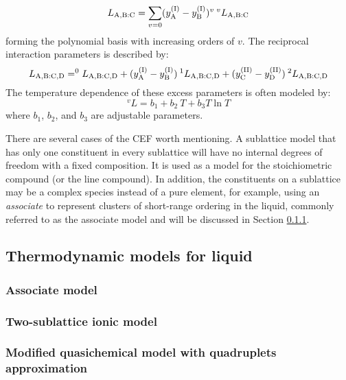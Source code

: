 \begin{equation} \label{method:eq:CEFLabc}
    L_{{\rm A,B}: {\rm C}} = \sum_{v=0}(y_{\rm A}^{({\rm I})}-y_{\rm B}^{({\rm I})})^v\:^vL_{{\rm A, B:C}}
\end{equation}
forming the polynomial basis with increasing orders of $v$. The reciprocal interaction parameters is described by:
\begin{equation} \label{method:eq:CEFLabcd}
    L_{{\rm A,B}:{\rm C,D}}=^0L_{{\rm A,B}:{\rm C,D}}+(y_{\rm A}^{({\rm I})}-y_{\rm B}^{({\rm I})})\:^1L_{{\rm A,B}:{\rm C,D}}+(y_{\rm C}^{({\rm II})}-y_{\rm D}^{({\rm II})})\:^2L_{{\rm A,B}:{\rm C,D}}
\end{equation}
The temperature dependence of these excess parameters is often modeled by:
\begin{equation} \label{method:eq:CEFLT}
    ^vL= b_1 + b_2\:T +b_3T\ln T
\end{equation}
where $b_1$, $b_2$, and $b_3$ are adjustable parameters.

There are several cases of the CEF worth mentioning. A sublattice model
that has only one constituent in every sublattice will have no internal degrees of freedom
with a fixed composition. It is used as a model for the stoichiometric compound (or the line compound). In addition, the constituents on a sublattice may be a complex species instead of a pure element, for example, using an \textit{associate} to represent clusters of short-range ordering in the liquid, commonly referred to as the associate model \cite{sommer1982association} and will be discussed in Section \ref{method:sssec:assm}.

\subsection{Thermodynamic models for liquid} \label{method:ssec:liqmodels}

\subsubsection{Associate model} \label{method:sssec:assm}

\subsubsection{Two-sublattice ionic model} \label{method:sssec:ionic}

\subsubsection{Modified quasichemical model with quadruplets approximation} \label{method:ssec:mqmqa}


